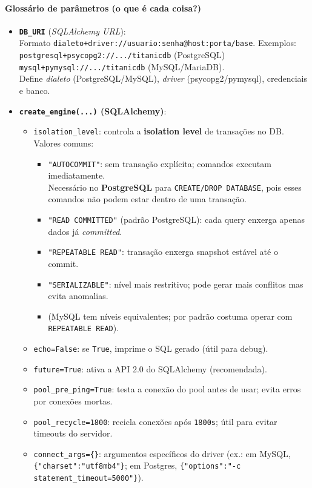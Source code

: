 \documentclass[12pt,a4paper]{article}
\begin{document}
\paragraph{Glossário de parâmetros (o que é cada coisa?)}
\begin{itemize}
  \item \textbf{\texttt{DB\_URI}} (\textit{SQLAlchemy URL}): \\
  Formato \texttt{dialeto+driver://usuario:senha@host:porta/base}. Exemplos: \\
  \texttt{postgresql+psycopg2://.../titanicdb} (PostgreSQL) \\
  \texttt{mysql+pymysql://.../titanicdb} (MySQL/MariaDB). \\
  Define \textit{dialeto} (PostgreSQL/MySQL), \textit{driver} (psycopg2/pymysql), credenciais e banco.
  
  \item \textbf{\texttt{create\_engine(...)} (SQLAlchemy)}:
  \begin{itemize}
    \item \texttt{isolation\_level}: controla a \textbf{isolation level} de transações no DB. Valores comuns:
      \begin{itemize}
        \item \texttt{"AUTOCOMMIT"}: sem transação explícita; comandos executam imediatamente. \\
        Necessário no \textbf{PostgreSQL} para \texttt{CREATE/DROP DATABASE}, pois esses comandos não podem estar dentro de uma transação.
        \item \texttt{"READ COMMITTED"} (padrão PostgreSQL): cada query enxerga apenas dados já \textit{committed}.
        \item \texttt{"REPEATABLE READ"}: transação enxerga snapshot estável até o commit.
        \item \texttt{"SERIALIZABLE"}: nível mais restritivo; pode gerar mais conflitos mas evita anomalias.
        \item (MySQL tem níveis equivalentes; por padrão costuma operar com \texttt{REPEATABLE READ}).
      \end{itemize}
    \item \texttt{echo=False}: se \texttt{True}, imprime o SQL gerado (útil para debug).
    \item \texttt{future=True}: ativa a API 2.0 do SQLAlchemy (recomendada).
    \item \texttt{pool\_pre\_ping=True}: testa a conexão do pool antes de usar; evita erros por conexões mortas.
    \item \texttt{pool\_recycle=1800}: recicla conexões após \texttt{1800s}; útil para evitar timeouts do servidor.
    \item \texttt{connect\_args=\{\}}: argumentos específicos do driver (ex.: em MySQL, \texttt{\{"charset":"utf8mb4"\}}; em Postgres, \texttt{\{"options":"-c statement\_timeout=5000"\}}).
  \end{itemize}


\end{itemize}
\end{document}
